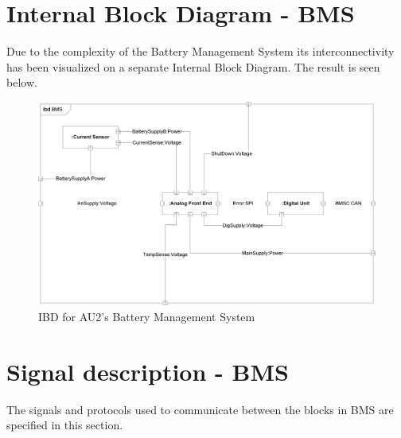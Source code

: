 \section{Internal Block Diagram - BMS}
Due to the complexity of the Battery Management System its interconnectivity has been visualized on a separate Internal Block Diagram. The result is seen below.

\begin{figure}[H]
	\centering
	\includegraphics[width=1\linewidth]{Architecture/Diagrams/IBD_BMS}
	\caption{IBD for AU2's Battery Management System}
	\label{fig:IBD_BMS}
\end{figure}

\section{Signal description - BMS}
The signals and protocols used to communicate between the blocks in BMS are specified in this section.

